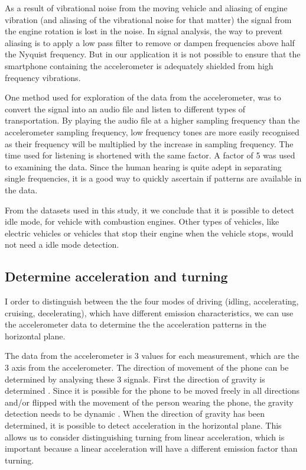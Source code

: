 As a result of vibrational noise from the moving vehicle and aliasing of engine vibration (and aliasing of the vibrational noise for that matter) the signal from the engine rotation is lost in the noise. In signal analysis, the way to prevent aliasing is to apply a low pass filter to remove or dampen frequencies above half the Nyquist frequency. But in our application it is not possible to ensure that the smartphone containing the accelerometer is adequately shielded from high frequency vibrations.

One method used for exploration of the data from the accelerometer, was to convert the signal into an audio file and listen to different types of transportation. By playing the audio file at a higher sampling frequency than the accelerometer sampling frequency, low frequency tones are more easily recognised as their frequency will be multiplied by the increase in sampling frequency. The time used for listening is shortened with the same factor. A factor of 5 was used to examining the data. Since the human hearing is quite adept in separating single frequencies, it is a good way to quickly ascertain if patterns are available in the data.

From the datasets used in this study, it we conclude that it is possible to detect idle mode, for vehicle with combustion engines. Other types of vehicles, like electric vehicles or vehicles that stop their engine when the vehicle stops, would not need a idle mode detection.

\subsection{Determine acceleration and turning}
I order to distinguish between the the four modes of driving (idling, accelerating, cruising, decelerating), which have different emission characteristics, we can use the accelerometer data to determine the the acceleration patterns in the horizontal plane.

The data from the accelerometer is 3 values for each measurement, which are the 3 axis from the accelerometer. The direction of movement of the phone can be determined by analysing these 3 signals. First the direction of gravity is determined . Since it is possible for the phone to be moved freely in all directions and/or flipped with the movement of the person wearing the phone, the gravity detection needs to be dynamic \cite{Hemminki2013}. When the direction of gravity has been determined, it is possible to detect acceleration in the horizontal plane. This allows us to consider distinguishing turning from linear acceleration, which is important because a linear acceleration will have a different emission factor than turning.

